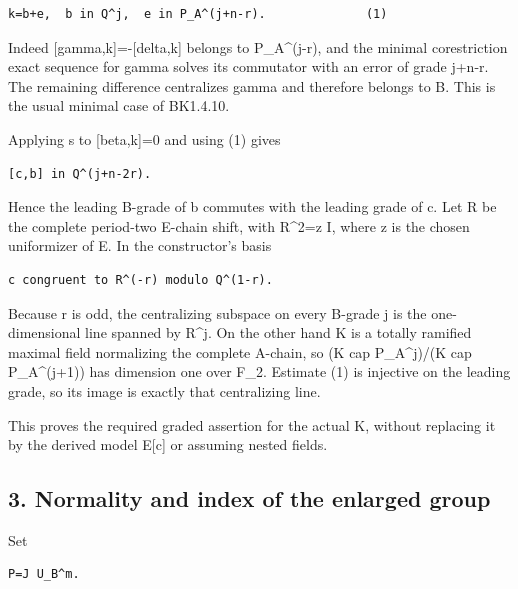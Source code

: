 \begin{Verbatim}[fontsize=\small,breaklines=true,breakanywhere=true]
k=b+e,  b in Q^j,  e in P_A^(j+n-r).              (1)
\end{Verbatim}

Indeed {[}gamma,k{]}=-{[}delta,k{]} belongs to P\_A\^{}(j-r), and the
minimal corestriction exact sequence for gamma solves its commutator
with an error of grade j+n-r. The remaining difference centralizes gamma
and therefore belongs to B. This is the usual minimal case of BK1.4.10.

Applying s to {[}beta,k{]}=0 and using (1) gives

\begin{Verbatim}[fontsize=\small,breaklines=true,breakanywhere=true]
[c,b] in Q^(j+n-2r).
\end{Verbatim}

Hence the leading B-grade of b commutes with the leading grade of c. Let
R be the complete period-two E-chain shift, with R\^{}2=z I, where z is
the chosen uniformizer of E. In the constructor's basis

\begin{Verbatim}[fontsize=\small,breaklines=true,breakanywhere=true]
c congruent to R^(-r) modulo Q^(1-r).
\end{Verbatim}

Because r is odd, the centralizing subspace on every B-grade j is the
one-dimensional line spanned by R\^{}j. On the other hand K is a totally
ramified maximal field normalizing the complete A-chain, so (K cap
P\_A\^{}j)/(K cap P\_A\^{}(j+1)) has dimension one over F\_2. Estimate
(1) is injective on the leading grade, so its image is exactly that
centralizing line.

This proves the required graded assertion for the actual K, without
replacing it by the derived model E{[}c{]} or assuming nested fields.

\hypertarget{rank~4-normality-and-index-of-the-enlarged-group}{%
\subsection{3. Normality and index of the enlarged
group}\label{rank~4-normality-and-index-of-the-enlarged-group}}

Set

\begin{Verbatim}[fontsize=\small,breaklines=true,breakanywhere=true]
P=J U_B^m.
\end{Verbatim}

